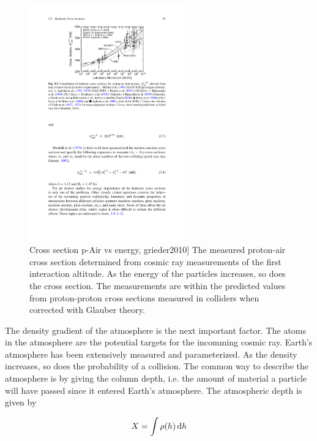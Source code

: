 \begin{figure}
    \centering
    \includegraphics[width=0.6\textwidth]
                    {plots/cosmic-rays/pair_crosssection}
    \caption{Cross section p-Air vs energy, grieder2010]
The measured proton-air cross section determined from cosmic ray measurements of the first interaction altitude. As the energy of the particles increases, so does the cross section. The measurements are within the predicted values from proton-proton cross sections measured in colliders when corrected with Glauber theory.}
    \label{fig:pair_crosssection}
\end{figure}


The density gradient of the atmosphere is the next important factor. The atoms in the atmosphere are the potential targets for the incomming cosmic ray. Earth's atmosphere has been extensively measured and parameterized. As the density increases, so does the probability of a collision. The common way to describe the atmosphere is by giving the column depth, i.e. the amount of material a particle will have passed since it entered Earth's atmosphere. The atmospheric depth is given by

\begin{equation}
    X = \int \rho(h) \mathop{}\!\mathrm{d} h
\end{equation}

